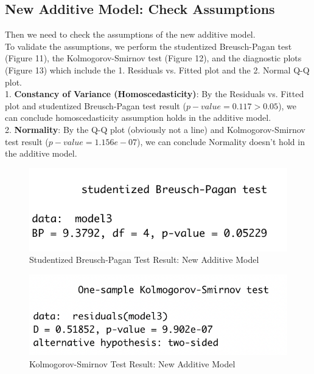 \documentclass[11pt,a4paper]{article}
\begin{document}
\subsection{New Additive Model: Check Assumptions}
Then we need to check the assumptions of the new additive model.\\
To validate the assumptions, we perform the studentized Breusch-Pagan test (Figure 11), the Kolmogorov-Smirnov test (Figure 12), and the diagnostic plots (Figure 13) which include the 1. Residuals vs. Fitted plot and the 2. Normal Q-Q plot.\\
1. \textbf{Constancy of Variance (Homoscedasticity)}: By the Residuals vs. Fitted plot and studentized Breusch-Pagan test result ($p-value=0.117>0.05$), we can conclude homoscedasticity assumption holds in the additive model.\\
2. \textbf{Normality}: By the Q-Q plot (obviously not a line) and Kolmogorov-Smirnov test result ($p-value=1.156e-07$), we can conclude Normality doesn't hold in the additive model.
\begin{figure}[htb]
    \centering
    \includegraphics[scale=1]{BP2}
    \caption{Studentized Breusch-Pagan Test Result: New Additive Model}
    \label{}
\end{figure}
\begin{figure}[htb]
    \centering
    \includegraphics[scale=1]{KS2}
    \caption{Kolmogorov-Smirnov Test Result: New Additive Model}
    \label{}
\end{figure}
\end{document}
